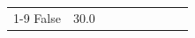 \begin{table}[H]
{\begin{tabular}{lllrlllll}
 \\
\cline{1-9}
False & 30.0%

\end{tabular}}
\end{table}
